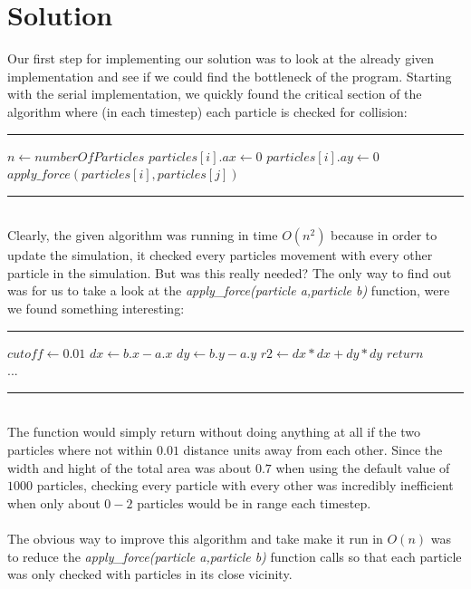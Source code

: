 \documentclass[11pt,a4paper]{article}
\begin{document}
\section{Solution}
Our first step for implementing our solution was to look at the already given implementation and see if we could find the bottleneck of the program. Starting with the serial implementation, we quickly found the critical section of the algorithm where (in each timestep) each particle is checked for collision:
\\
\rule{125mm}{0.1pt}
\begin{algorithmic}
\STATE $n \gets numberOfParticles$
	\STATE $particles[i].ax \gets 0$
	\STATE $particles[i].ay \gets 0$
			\STATE $apply\_force(particles[i],particles[j])$
	\ENDFOR
\ENDFOR 
\end{algorithmic}
\rule{125mm}{0.1pt}
\vspace{10pt}
\\
Clearly, the given algorithm was running in time $O(n^{2})$ because in order to update the simulation, it checked every particles movement with every other particle in the simulation. But was this really needed? The only way to find out was for us to take a look at the \emph{apply\_force(particle a,particle b)} function, were we found something interesting:
\\
\rule{125mm}{0.1pt}
\begin{algorithmic}
\STATE $cutoff \gets 0.01$
\STATE $dx \gets b.x - a.x$
\STATE $dy \gets b.y - a.y$
\STATE $r2 \gets dx*dx + dy*dy$
	\STATE $return$
\ENDIF
\\
...
\end{algorithmic}
\rule{125mm}{0.1pt}
\vspace{10pt}
\\
The function would simply return without doing anything at all if the two particles where not within $0.01$ distance units away from each other. Since the width and hight of the total area was about $0.7$ when using the default value of $1000$ particles, checking every particle with every other was incredibly inefficient when only about $0-2$ particles would be in range each timestep.
\\
\\
The obvious way to improve this algorithm and take make it run in $O(n)$ was to reduce the \emph{apply\_force(particle a,particle b)} function calls so that each particle was only checked with particles in its close vicinity.
\end{document}
